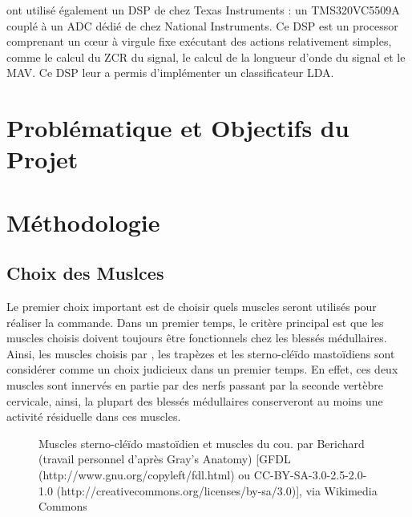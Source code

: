 \documentclass[letterpaper, twoside, 12pt, memoire, creativecommons, hyperref]{thETS}
\begin{document}
\cite{Tenore2007} ont utilisé également un DSP de chez Texas Instruments : un TMS320VC5509A couplé à un ADC dédié de chez National Instruments. Ce DSP est un processor comprenant un cœur à virgule fixe exécutant des actions relativement simples, comme le calcul du ZCR du signal, le calcul de la longueur d’onde du signal et le MAV. Ce DSP leur a permis d'implémenter un classificateur LDA.


\chapter{Problématique et Objectifs du Projet}

\chapter{Méthodologie}\label{CHmethodo}

\section{Choix des Muslces}

Le premier choix important est de choisir quels muscles seront utilisés pour réaliser la commande. Dans un premier temps, le critère principal est que les muscles choisis doivent toujours être fonctionnels chez les blessés médullaires. Ainsi, les muscles choisis par \cite{Chang1996}, les trapèzes et les sterno-cléïdo mastoïdiens sont considérer comme un choix judicieux dans un premier temps. En effet, ces deux muscles sont innervés en partie par des nerfs passant par la seconde vertèbre cervicale, ainsi, la plupart des blessés médullaires conserveront au moins une activité résiduelle dans ces muscles. 

\begin{figure}
	\centering
	\caption{Muscles sterno-cléïdo mastoïdien et muscles du cou.
	par Berichard (travail personnel d'après Gray's Anatomy) [GFDL (http://www.gnu.org/copyleft/fdl.html) ou CC-BY-SA-3.0-2.5-2.0-1.0 (http://creativecommons.org/licenses/by-sa/3.0)], via Wikimedia Commons}
	\label{fig:muscles}
\end{figure}
\end{document}
